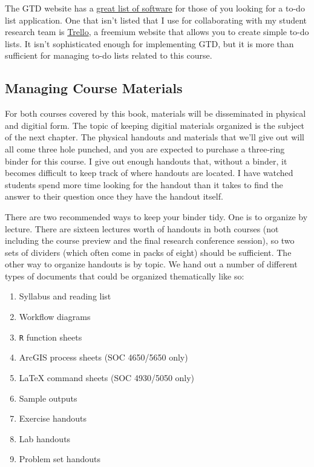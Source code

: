 \documentclass[]{book}
\providecommand{\tightlist}{%
  \setlength{\itemsep}{0pt}\setlength{\parskip}{0pt}}
\theoremstyle{definition}
\theoremstyle{definition}
\theoremstyle{definition}
\theoremstyle{remark}
\begin{document}
The GTD website has a
\href{http://gettingthingsdone.com/common-tools-software/}{great list of
software} for those of you looking for a to-do list application. One
that isn't listed that I use for collaborating with my student research
team is \href{https://trello.com}{Trello}, a freemium website that
allows you to create simple to-do lists. It isn't sophisticated enough
for implementing GTD, but it is more than sufficient for managing to-do
lists related to this course.

\subsection{Managing Course Materials}\label{managing-course-materials}

For both courses covered by this book, materials will be disseminated in
physical and digitial form. The topic of keeping digitial materials
organized is the subject of the next chapter. The physical handouts and
materials that we'll give out will all come three hole punched, and you
are expected to purchase a three-ring binder for this course. I give out
enough handouts that, without a binder, it becomes difficult to keep
track of where handouts are located. I have watched students spend more
time looking for the handout than it takes to find the answer to their
question once they have the handout itself.

There are two recommended ways to keep your binder tidy. One is to
organize by lecture. There are sixteen lectures worth of handouts in
both courses (not including the course preview and the final research
conference session), so two sets of dividers (which often come in packs
of eight) should be sufficient. The other way to organize handouts is by
topic. We hand out a number of different types of documents that could
be organized thematically like so:

\begin{enumerate}
\def\labelenumi{\arabic{enumi}.}
\tightlist
\item
  Syllabus and reading list
\item
  Workflow diagrams
\item
  \texttt{R} function sheets
\item
  ArcGIS process sheets (SOC 4650/5650 only)
\item
  LaTeX command sheets (SOC 4930/5050 only)
\item
  Sample outputs
\item
  Exercise handouts
\item
  Lab handouts
\item
  Problem set handouts
\end{enumerate}
\end{document}

